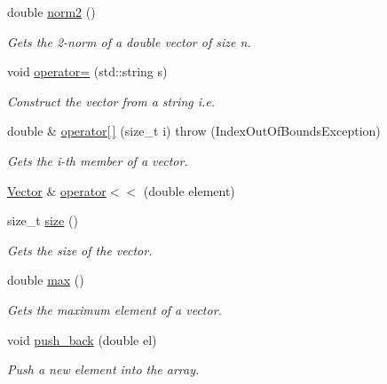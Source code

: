 \begin{CompactItemize}
double \hyperlink{classgrassmann_1_1Vector_1c53c0f4829396b3db7aa4096d37d605}{norm2} ()
\begin{CompactList}\small\item\em Gets the 2-norm of a double vector of size n. \item\end{CompactList}\item 
void \hyperlink{classgrassmann_1_1Vector_838a1376ed8e8d5bcb63ae71258711a4}{operator=} (std::string s)
\begin{CompactList}\small\item\em Construct the vector from a string i.e. \item\end{CompactList}\item 
double \& \hyperlink{classgrassmann_1_1Vector_ff6d641099c55e400a9116415fa86c6c}{operator\mbox{[}$\,$\mbox{]}} (size\_\-t i)  throw (IndexOutOfBoundsException)
\begin{CompactList}\small\item\em Gets the i-th member of a vector. \item\end{CompactList}\item 
\hyperlink{classgrassmann_1_1Vector}{Vector} \& \hyperlink{classgrassmann_1_1Vector_69966901d7ffcd3f0df9ffd37a637a1c}{operator$<$$<$} (double element)
\item 
size\_\-t \hyperlink{classgrassmann_1_1Vector_9ca025b6499bf75f21295c3fa49d03b4}{size} ()
\begin{CompactList}\small\item\em Gets the size of the vector. \item\end{CompactList}\item 
double \hyperlink{classgrassmann_1_1Vector_5b66d2b06688e0e4abfb7a2d62c73f35}{max} ()
\begin{CompactList}\small\item\em Gets the maximum element of a vector. \item\end{CompactList}\item 
void \hyperlink{classgrassmann_1_1Vector_b291b7fed796d989e4448c240857cf63}{push\_\-back} (double el)
\begin{CompactList}\small\item\em Push a new element into the array. \item\end{CompactList}\item 

\end{CompactItemize}
